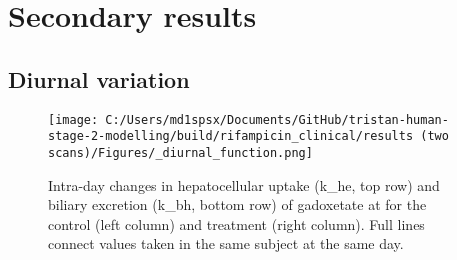 \documentclass{epflreport}%
\begin{document}
\chapter{Secondary results}%
\section{Diurnal variation}%
\label{sec:Diurnalvariation}%

%


\begin{figure}[h!]%
\centering%
\texttt{[image: C:/Users/md1spsx/Documents/GitHub/tristan-human-stage-2-modelling/build/rifampicin\_clinical/results (two scans)/Figures/\_diurnal\_function.png]}%
\caption{Intra{-}day changes in hepatocellular uptake (k\_he, top row) and biliary excretion (k\_bh, bottom row) of gadoxetate at for the control (left column) and treatment (right column). Full lines connect values taken in the same subject at the same day.}%
\end{figure}

%
\end{document}
